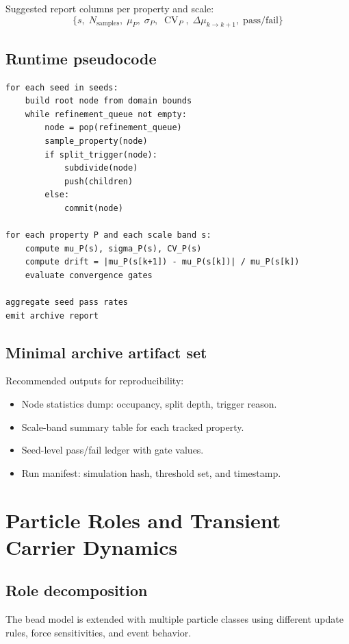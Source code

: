 \documentclass[11pt, a4paper, oneside]{article}
\DeclareMathOperator{\CV}{CV}
\begin{document}
Suggested report columns per property and scale:
\begin{equation}
\{s,\;N_{\text{samples}},\;\mu_P,\;\sigma_P,\;\CV_P,\;\Delta\mu_{k\to k+1},\;\text{pass/fail}\}
\end{equation}

\subsection{Runtime pseudocode}

\begin{verbatim}
for each seed in seeds:
	build root node from domain bounds
	while refinement_queue not empty:
		node = pop(refinement_queue)
		sample_property(node)
		if split_trigger(node):
			subdivide(node)
			push(children)
		else:
			commit(node)

for each property P and each scale band s:
	compute mu_P(s), sigma_P(s), CV_P(s)
	compute drift = |mu_P(s[k+1]) - mu_P(s[k])| / mu_P(s[k])
	evaluate convergence gates

aggregate seed pass rates
emit archive report
\end{verbatim}

\subsection{Minimal archive artifact set}

Recommended outputs for reproducibility:
\begin{itemize}
  \item Node statistics dump: occupancy, split depth, trigger reason.
  \item Scale-band summary table for each tracked property.
  \item Seed-level pass/fail ledger with gate values.
  \item Run manifest: simulation hash, threshold set, and timestamp.
\end{itemize}

\section{Particle Roles and Transient Carrier Dynamics}

\subsection{Role decomposition}

The bead model is extended with multiple particle classes using different
update rules, force sensitivities, and event behavior.
\end{document}
